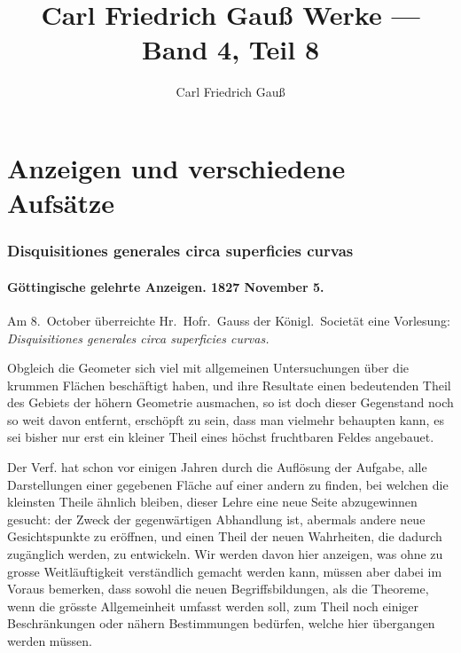 \documentclass[fontsize=10pt,paper=a5,pagesize,headings=small,headinclude=true,footinclude=true]{scrbook}
\title{\normalfont\LARGE\bfseries Carl Friedrich Gauß Werke --- Band 4, Teil 8}
\author{Carl Friedrich Gauß}
\date{}
\begin{document}
\maketitle
\thispagestyle{empty}

\tableofcontents
\newpage


\part*{Anzeigen und verschiedene Aufsätze}

\section*{Disquisitiones generales circa superficies curvas}

\subsection*{Göttingische gelehrte Anzeigen. 1827 November 5.}

Am 8.~October überreichte Hr.~Hofr.~Gauss der Königl.~Societät eine Vorlesung:
\textit{Disquisitiones generales circa superficies curvas.}

Obgleich die Geometer sich viel mit allgemeinen Untersuchungen über die krummen Flächen beschäftigt haben, und ihre Resultate einen bedeutenden Theil des Gebiets der höhern Geometrie ausmachen, so ist doch dieser Gegenstand noch so weit davon entfernt, erschöpft zu sein, dass man vielmehr behaupten kann, es sei bisher nur erst ein kleiner Theil eines höchst fruchtbaren Feldes angebauet.

Der Verf. hat schon vor einigen Jahren durch die Auflösung der Aufgabe, alle Darstellungen einer gegebenen Fläche auf einer andern zu finden, bei welchen die kleinsten Theile ähnlich bleiben, dieser Lehre eine neue Seite abzugewinnen gesucht: der Zweck der gegenwärtigen Abhandlung ist, abermals andere neue Gesichtspunkte zu eröffnen, und einen Theil der neuen Wahrheiten, die dadurch zugänglich werden, zu entwickeln. Wir werden davon hier anzeigen, was ohne zu grosse Weitläuftigkeit verständlich gemacht werden kann, müssen aber dabei im Voraus bemerken, dass sowohl die neuen Begriffsbildungen, als die Theoreme, wenn die grösste Allgemeinheit umfasst werden soll, zum Theil noch einiger Beschränkungen oder nähern Bestimmungen bedürfen, welche hier übergangen werden müssen.
\end{document}
